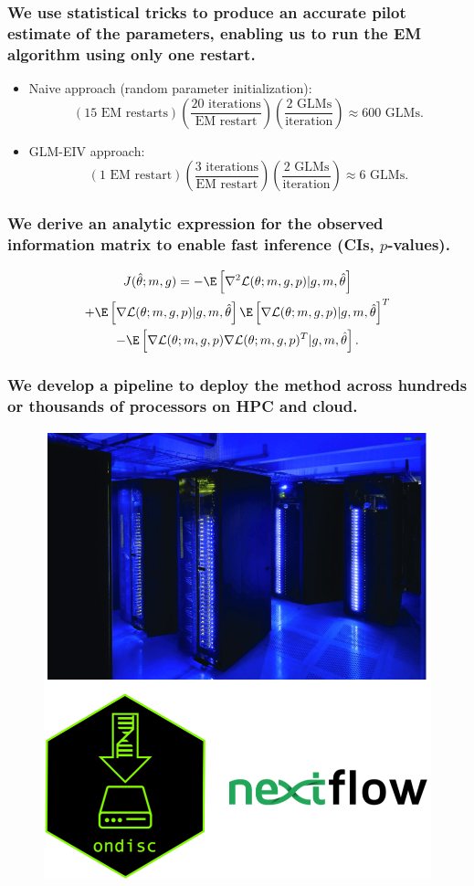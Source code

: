 \documentclass{beamer}
\begin{document}
\begin{frame}
\frametitle{We use statistical tricks to produce an accurate pilot estimate of the parameters, enabling us to run the EM algorithm using only one restart.}
\begin{itemize}
	\item Naive approach (random parameter initialization): $$\left( \textrm{15 EM restarts} \right) \left( \frac{ \textrm{20 iterations} }{\textrm{EM restart}} \right) \left( \frac{\textrm{2 GLMs}}{\textrm{iteration}}\right) \approx \textrm{600 GLMs}.$$
	\item GLM-EIV approach: 
	$$ \left(\textrm{1 EM restart}\right) \left( \frac{ \textrm{3 iterations}}{\textrm{EM restart}} \right)\left( \frac{ \textrm{2 GLMs} }{ \textrm{iteration} } \right) \approx \textrm{6 GLMs}.$$
\end{itemize}
\end{frame}


\begin{frame}
\frametitle{We derive an analytic expression for the observed information matrix to enable fast inference (CIs, $p$-values).}
\begin{multline*}
J(\hat{\theta}; m, g) = -\E \left[\nabla^2 \mathcal{L}(\theta; m, g, p) | g, m, \hat{\theta} \right] \\ + \E\left[ \nabla \mathcal{L}(\theta; m, g, p) |  g, m, \hat{\theta} \right] \E\left[ \nabla \mathcal{L}(\theta; m, g, p) | g, m, \hat{\theta}\right]^T \\ - \E\left[ \nabla\mathcal{L}(\theta; m, g, p) \nabla \mathcal{L}(\theta; m, g, p)^T | g, m, \hat{\theta} \right].
\end{multline*}
\end{frame}

\begin{frame}
\frametitle{We develop a pipeline to deploy the method across hundreds or thousands of processors on HPC and cloud.}

\begin{figure}
	\centering
	\includegraphics[width=0.6\linewidth]{extra_figs/computing}
\end{figure}
\end{frame}
\end{document}
